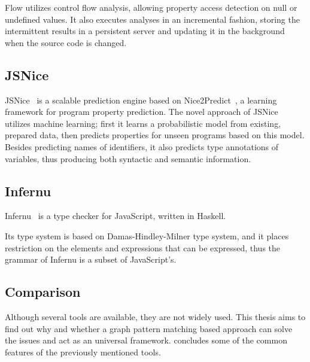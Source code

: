 Flow utilizes control flow analysis, allowing property access detection on null or undefined values. It also executes analyses in an incremental fashion, storing the intermittent results in a persistent server and updating it in the background when the source code is changed.


\subsection{JSNice}
JSNice~\cite{jsnice} is a scalable prediction engine based on Nice2Predict~\cite{nice2predict}, a learning framework for program property prediction. The novel approach of JSNice utilizes machine learning; first it learns a probabilistic model from existing, prepared data, then predicts properties for unseen programs based on this model. Besides predicting names of identifiers, it also predicts type annotations of variables, thus producing both syntactic and semantic information.~\cite{jsnice15}

\subsection{Infernu}
Infernu~\cite{infernu} is a type checker for JavaScript, written in Haskell. 

Its type system is based on Damas-Hindley-Milner type system, and it places restriction on the elements and expressions that can be expressed, thus the grammar of Infernu is a subset of JavaScript's.


\subsection{Comparison}
Although several tools are available, they are not widely used. This thesis aims to find out why and whether a graph pattern matching based approach can solve the issues and act as an universal framework.  concludes some of the common features of the previously mentioned tools.

